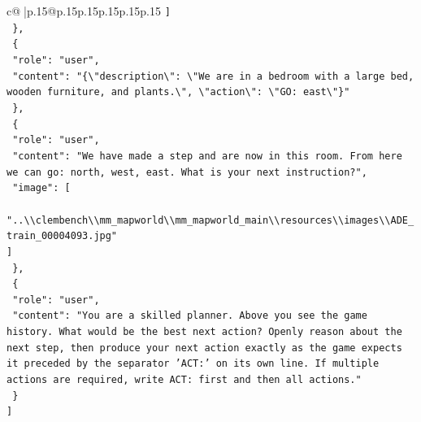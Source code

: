 \documentclass{article}
\begin{document}
{\begin{supertabular}{c@{$\;$}|p{.15\linewidth}@{}p{.15\linewidth}p{.15\linewidth}p{.15\linewidth}p{.15\linewidth}p{.15\linewidth}}
{{{\texttt{    {]}} \\
\texttt{  \},} \\
\texttt{  \{} \\
\texttt{    "role": "user",} \\
\texttt{    "content": "\{\textbackslash{}"description\textbackslash{}": \textbackslash{}"We are in a bedroom with a large bed, wooden furniture, and plants.\textbackslash{}", \textbackslash{}"action\textbackslash{}": \textbackslash{}"GO: east\textbackslash{}"\}"} \\
\texttt{  \},} \\
\texttt{  \{} \\
\texttt{    "role": "user",} \\
\texttt{    "content": "We have made a step and are now in this room. From here we can go: north, west, east. What is your next instruction?",} \\
\texttt{    "image": {[}} \\
\texttt{      "..\textbackslash{}\textbackslash{}clembench\textbackslash{}\textbackslash{}mm\_mapworld\textbackslash{}\textbackslash{}mm\_mapworld\_main\textbackslash{}\textbackslash{}resources\textbackslash{}\textbackslash{}images\textbackslash{}\textbackslash{}ADE\_train\_00004093.jpg"} \\
\texttt{    {]}} \\
\texttt{  \},} \\
\texttt{  \{} \\
\texttt{    "role": "user",} \\
\texttt{    "content": "You are a skilled planner. Above you see the game history. What would be the best next action? Openly reason about the next step, then produce your next action exactly as the game expects it preceded by the separator 'ACT:' on its own line. If multiple actions are required, write ACT: first and then all actions."} \\
\texttt{  \}} \\
\texttt{{]}} \\
            }
        }
    }
     \\ \\


\end{supertabular}}
\end{document}
